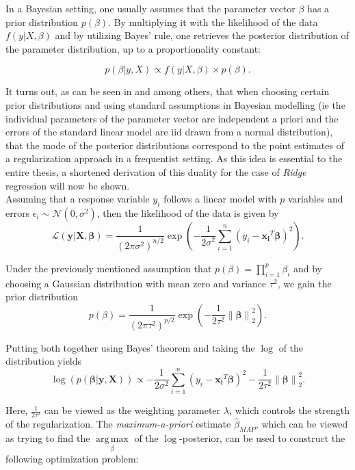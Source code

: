 \documentclass[12pt,a4paper]{article}
\newcommand{\norm}[1]{\left\lVert#1\right\rVert}
\DeclareMathOperator*{\argmax}{arg\,max}
\begin{document}
In a Bayesian setting, one usually assumes that the parameter vector $\mathbb{\beta}$ has a prior distribution $p(\mathbb{\beta})$. By multiplying it with the likelihood of the data $f(y|X,\beta)$ and by utilizing Bayes' rule, one retrieves the posterior distribution of the parameter distribution, up to a proportionality constant:

$$p(\beta|y,X) \propto f(y|X, \beta) \times p(\beta).$$  

It turns out, as can be seen in \textcite[248--250]{ESL2009} and \textcite{VanWieringen2015} among others, that when choosing certain prior distributions and using standard assumptions in Bayesian modelling (ie the individual parameters of the parameter vector are independent a priori and the errors of the standard linear model are iid drawn from a normal distribution), that the mode of the posterior distributions correspond to the point estimates of a regularization approach in a frequentist setting. As this idea is essential to the entire thesis, a shortened derivation of this duality for the case of \textit{Ridge} regression will now be shown.\\

Assuming that a response variable $y_i$ follows a linear model with $p$ variables and errors $\epsilon_i \sim \mathcal{N}(0, \sigma^2)$, then the likelihood of the data is given by
$$\mathcal{L}(\mathbf{y}|\mathbf{X},\mathbf{\beta})=\frac{1}{(2\pi\sigma^2)^{n/2}}\exp\left(-\frac{1}{2\sigma^2}\sum_{i=1}^n(y_i-\mathbf{x_i}^T\mathbf{\beta})^2\right).$$

Under the previously mentioned assumption that $p(\beta) = \prod_{i=1}^p \beta_i$ and by choosing a Gaussian distribution with mean zero and variance $\tau^2$, we gain the prior distribution
$$p(\beta) = \frac{1}{(2\pi\tau^2)^{p/2}}\exp\left(-\frac{1}{2\tau^2}\norm{\mathbf{\beta}}_2^2\right).$$

Putting both together using Bayes' theorem and taking the $\log$ of the distribution yields
$$\log(p(\mathbf{\beta}|\mathbf{y},\mathbf{X})) \propto -\frac{1}{2\sigma^2}\sum_{i=1}^n (y_i-\mathbf{x_i}^T\mathbf{\beta})^2  - \frac{1}{2\tau^2}\norm{\mathbf{\beta}}_2^2.$$

Here, $\frac{1}{2\tau^2}$ can be viewed as the weighting parameter $\lambda$, which controls the strength of the regularization. The \textit{maximum-a-priori} estimate $\hat{\beta}_{MAP}$, which can be viewed as trying to find the $\underset{\beta}{\argmax}$ of the $\log$-posterior, can be used to construct the following optimization problem:
\end{document}
